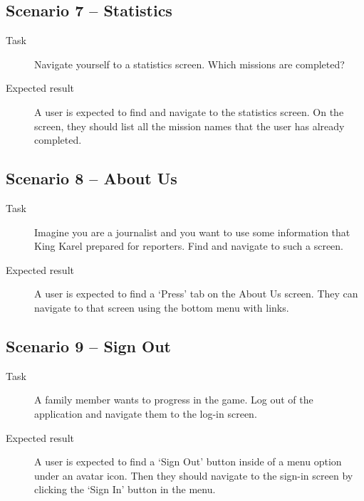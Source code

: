 \subsection*{Scenario 7 -- Statistics}

\begin{description}
    \item[Task] Navigate yourself to a statistics screen.
    Which missions are completed?
    \item[Expected result] A user is expected to
    find and navigate to the statistics screen.
    On the screen,
    they should list all the mission names that the user has already completed.
\end{description}

\subsection*{Scenario 8 -- About Us}

\begin{description}
    \item[Task] Imagine you are a journalist
    and you want to use some information
    that King Karel prepared for reporters.
    Find and navigate to such a screen.
    \item[Expected result] A user is expected to
    find a \enquote*{Press} tab on the About Us screen.
    They can navigate to that screen using the bottom menu with links.
\end{description}

\subsection*{Scenario 9 -- Sign Out}

\begin{description}
    \item[Task] A family member wants to progress in the game.
    Log out of the application
    and navigate them to the log-in screen.
    \item[Expected result] A user is expected to
    find a \enquote*{Sign Out} button inside of a menu option under an avatar icon.
    Then they should navigate to the sign-in screen
    by clicking the \enquote*{Sign In} button in the menu.    
\end{description}
